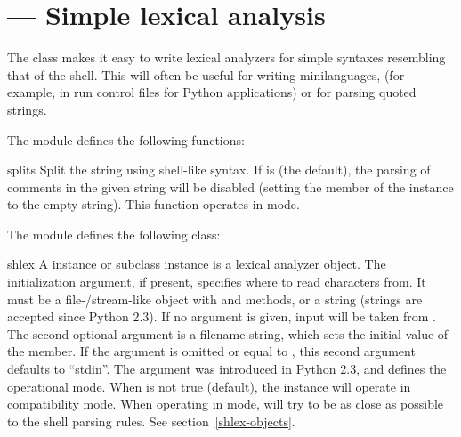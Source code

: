 \section{ ---
         Simple lexical analysis}



The  class makes it easy to write lexical analyzers for
simple syntaxes resembling that of the \UNIX{} shell.  This will often
be useful for writing minilanguages, (for example, in run control
files for Python applications) or for parsing quoted strings.

The  module defines the following functions:

\begin{funcdesc}{split}{s}
Split the string  using shell-like syntax. If  is
 (the default), the parsing of comments in the given
string will be disabled (setting the  member of the
 instance to the empty string).  This function operates
in \POSIX{} mode.
\end{funcdesc}

The  module defines the following class:

\begin{classdesc}{shlex}{}
A  instance or subclass instance is a lexical analyzer
object.  The initialization argument, if present, specifies where to
read characters from. It must be a file-/stream-like object with
 and  methods, or a string (strings
are accepted since Python 2.3). If no argument is given, input will be
taken from .  The second optional argument is a filename
string, which sets the initial value of the  member.  If
the  argument is omitted or equal to ,
this second argument defaults to ``stdin''.  The  argument
was introduced in Python 2.3, and defines the operational mode.  When
 is not true (default), the  instance will
operate in compatibility mode.  When operating in \POSIX{} mode,
 will try to be as close as possible to the \POSIX{} shell
parsing rules.  See section~\ref{shlex-objects}.
\end{classdesc}

